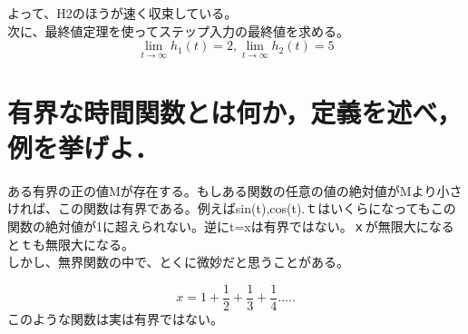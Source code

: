 \documentclass[xelatex,ja=standard,jafont=noto]{bxjsarticle}
\begin{document}
		 
		よって、H2のほうが速く収束している。\\
	次に、最終値定理を使ってステップ入力の最終値を求める。
		 \begin{equation}
		 \lim_{t \to \infty} h_{1}(t) = 2, \lim_{t \to \infty} h_{2}(t) = 5
		 \end{equation}
		 
		 \newpage
		
		\section{有界な時間関数とは何か，定義を述べ，例を挙げよ．}
		ある有界の正の値Mが存在する。もしある関数の任意の値の絶対値がMより小さければ、この関数は有界である。例えばsin(t),cos(t).ｔはいくらになってもこの関数の絶対値が1に超えられない。逆にt=xは有界ではない。ｘが無限大になるとｔも無限大になる。\\
		しかし、無界関数の中で、とくに微妙だと思うことがある。
		
		 \begin{equation}
		x=1+\frac{1}{2}+\frac{1}{3}+\frac{1}{4}.....
		\end{equation}
	このような関数は実は有界ではない。
\end{document}
